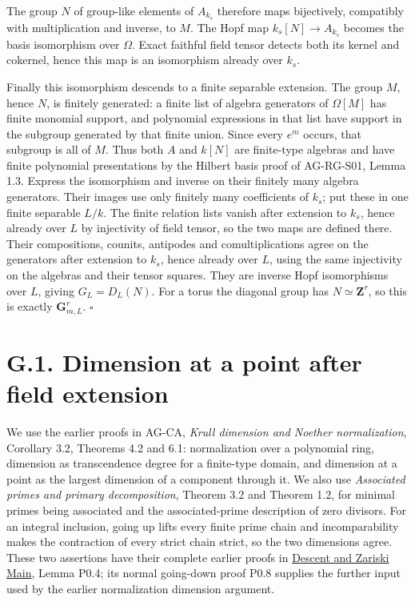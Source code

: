 \documentclass[11pt,a4paper,openany]{report}
\begin{document}
The group \(N\) of group-like elements of \(A_{k_s}\) therefore maps bijectively, compatibly with multiplication and inverse, to \(M\). The Hopf map \(k_s[N]\to A_{k_s}\) becomes the basis isomorphism over \(\Omega\). Exact faithful field tensor detects both its kernel and cokernel, hence this map is an isomorphism already over \(k_s\).

Finally this isomorphism descends to a finite separable extension. The group \(M\), hence \(N\), is finitely generated: a finite list of algebra generators of \(\Omega[M]\) has finite monomial support, and polynomial expressions in that list have support in the subgroup generated by that finite union. Since every \(e^m\) occurs, that subgroup is all of \(M\). Thus both \(A\) and \(k[N]\) are finite-type algebras and have finite polynomial presentations by the Hilbert basis proof of AG-RG-S01, Lemma 1.3. Express the isomorphism and inverse on their finitely many algebra generators. Their images use only finitely many coefficients of \(k_s\); put these in one finite separable \(L/k\). The finite relation lists vanish after extension to \(k_s\), hence already over \(L\) by injectivity of field tensor, so the two maps are defined there. Their compositions, counits, antipodes and comultiplications agree on the generators after extension to \(k_s\), hence already over \(L\), using the same injectivity on the algebras and their tensor squares. They are inverse Hopf isomorphisms over \(L\), giving \(G_L=D_L(N)\). For a torus the diagonal group has \(N\simeq\mathbf Z^r\), so this is exactly \(\mathbf G_{m,L}^r\). \(\square\)

\section{G.1. Dimension at a point after field extension}\label{AG-RG-S08-g.1.-dimension-at-a-point-after-field-extension}

We use the earlier proofs in AG-CA, \emph{Krull dimension and Noether normalization}, Corollary 3.2, Theorems 4.2 and 6.1: normalization over a polynomial ring, dimension as transcendence degree for a finite-type domain, and dimension at a point as the largest dimension of a component through it. We also use \emph{Associated primes and primary decomposition}, Theorem 3.2 and Theorem 1.2, for minimal primes being associated and the associated-prime description of zero divisors. For an integral inclusion, going up lifts every finite prime chain and incomparability makes the contraction of every strict chain strict, so the two dimensions agree. These two assertions have their complete earlier proofs in \href{https://github.com/KokunoYumeto/open-math-courses/blob/main/docs/courses/AG-RG/AG-RG-S04.md}{Descent and Zariski Main}, Lemma P0.4; its normal going-down proof P0.8 supplies the further input used by the earlier normalization dimension argument.
\end{document}
